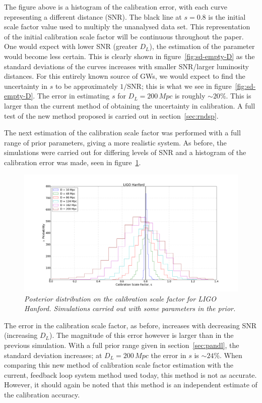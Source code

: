 \documentclass{jpconf}
\begin{document}
The figure above is a histogram of the calibration error, with each curve representing a different distance (SNR). The black line at $s = 0.8$ is the initial scale factor value used to multiply the unanalysed data set. This representation of the initial calibration scale factor will be continuous throughout the paper. 
One would expect with lower SNR (greater $D_{L}$), the estimation of the parameter would become less certain. This is clearly shown in figure~\ref{fig:sd-empty-D} as the standard deviations of the curves increases with smaller SNR/larger luminosity distances. For this entirely known source of GWs, we would expect to find the uncertainty in $s$ to be approximately $1/$SNR; this is what we see in figure~\ref{fig:sd-empty-D}. The error in estimating $s$ for $D_{L} = 200 \,Mpc$ is roughly $\sim 20\%$. This is larger than the current method of obtaining the uncertainty in calibration. A full test of the new method proposed is carried out in section~\ref{sec:rndsp}. 

The next estimation of the calibration scale factor was performed with a full range of prior parameters, giving a more realistic system. As before, the simulations were carried out for differing levels of SNR and a histogram of the calibration error was made, seen in figure~\ref{fig:sd-non-empty-D}.

\begin{figure}[h]
  \centering 
  \includegraphics[width = \textwidth]{SD_non_empty_D10_200}
  \caption{\textit{Posterior distribution on the calibration scale factor for LIGO Hanford. Simulations carried out with some parameters in the prior.}}
  \label{fig:sd-non-empty-D}
\end{figure}

The error in the calibration scale factor, as before, increases with decreasing SNR (increasing $D_{L}$). The magnitude of this error however is larger than in the previous simulation. With a full prior range given in section~\ref{sec:pandl}, the standard deviation increases; at $D_{L} = 200\,Mpc$ the error in $s$ is $\sim 24\%$. When comparing this new method of calibration scale factor estimation with the current, feedback loop system method used today, this method is not as accurate. However, it should again be noted that this method is an independent estimate of the calibration accuracy.
\end{document}
